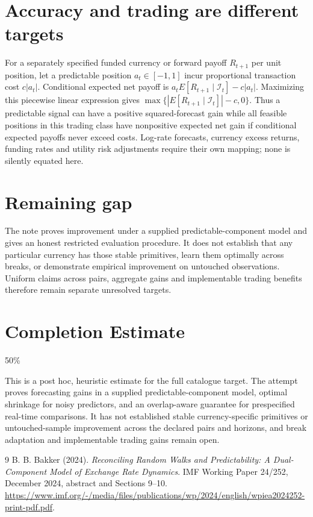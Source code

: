 \documentclass[11pt]{article}
\theoremstyle{remark}
\begin{document}
\section*{Accuracy and trading are different targets}
For a separately specified funded currency or forward payoff $R_{t+1}$ per unit position, let a predictable position $a_t\in[-1,1]$ incur proportional transaction cost $c|a_t|$. Conditional expected net payoff is
$a_tE[R_{t+1}\mid\mathcal I_t]-c|a_t|$. Maximizing this piecewise linear expression gives
$\max\{|E[R_{t+1}\mid\mathcal I_t]|-c,0\}$.
Thus a predictable signal can have a positive squared-forecast gain while all feasible positions in this trading class have nonpositive expected net gain if conditional expected payoffs never exceed costs. Log-rate forecasts, currency excess returns, funding rates and utility risk adjustments require their own mapping; none is silently equated here.

\section*{Remaining gap}
The note proves improvement under a supplied predictable-component model and gives an honest restricted evaluation procedure. It does not establish that any particular currency has those stable primitives, learn them optimally across breaks, or demonstrate empirical improvement on untouched observations. Uniform claims across pairs, aggregate gains and implementable trading benefits therefore remain separate unresolved targets.

\section{Completion Estimate}
50\%

This is a post hoc, heuristic estimate for the full catalogue target.
The attempt proves forecasting gains in a supplied predictable-component model, optimal shrinkage for noisy predictors, and an overlap-aware guarantee for prespecified real-time comparisons. It has not established stable currency-specific primitives or untouched-sample improvement across the declared pairs and horizons, and break adaptation and implementable trading gains remain open.

\begin{thebibliography}{9}
 B. B. Bakker (2024). \emph{Reconciling Random Walks and Predictability: A Dual-Component Model of Exchange Rate Dynamics}. IMF Working Paper 24/252, December 2024, abstract and Sections 9--10. \url{https://www.imf.org/-/media/files/publications/wp/2024/english/wpiea2024252-print-pdf.pdf}.
\end{thebibliography}
\end{document}
